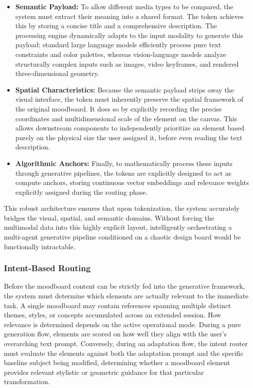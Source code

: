 \begin{itemize}
    \item \textbf{Semantic Payload:} To allow different media types to be compared, the system must extract their meaning into a shared format. The token achieves this by storing a concise title and a comprehensive description. The processing engine dynamically adapts to the input modality to generate this payload: standard large language models efficiently process pure text constraints and color palettes, whereas vision-language models analyze structurally complex inputs such as images, video keyframes, and rendered three-dimensional geometry. 
    \item \textbf{Spatial Characteristics:} Because the semantic payload strips away the visual interface, the token must inherently preserve the spatial framework of the original moodboard. It does so by explicitly recording the precise coordinates and multidimensional scale of the element on the canvas. This allows downstream components to independently prioritize an element based purely on the physical size the user assigned it, before even reading the text description.
    \item \textbf{Algorithmic Anchors:} Finally, to mathematically process these inputs through generative pipelines, the tokens are explicitly designed to act as compute anchors, storing continuous vector embeddings and relevance weights explicitly assigned during the routing phase.
\end{itemize}

This robust architecture ensures that upon tokenization, the system accurately bridges the visual, spatial, and semantic domains. Without forcing the multimodal data into this highly explicit layout, intelligently orchestrating a multi-agent generative pipeline conditioned on a chaotic design board would be functionally intractable.

\subsubsection{Intent-Based Routing}

Before the moodboard content can be strictly fed into the generative framework, the system must determine which elements are actually relevant to the immediate task. A single moodboard may contain references spanning multiple distinct themes, styles, or concepts accumulated across an extended session. How relevance is determined depends on the active operational mode. During a pure generation flow, elements are scored on how well they align with the user's overarching text prompt. Conversely, during an adaptation flow, the intent router must evaluate the elements against both the adaptation prompt and the specific baseline subject being modified, determining whether a moodboard element provides relevant stylistic or geometric guidance for that particular transformation.

